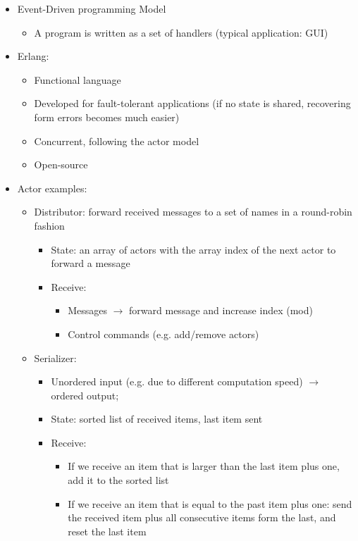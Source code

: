 \documentclass[a4paper]{article}
\begin{document}
\begin{itemize}
\begin{itemize}
\end{itemize}
\item Event-Driven programming Model 
\begin{itemize}
\item A program is written as a set of handlers (typical application: GUI)
\end{itemize}
\item Erlang: 
\begin{itemize}
\item Functional language
\item Developed for fault-tolerant applications (if no state is shared, recovering form errors becomes much easier)
\item Concurrent, following the actor model
\item Open-source 
\end{itemize}
\item Actor examples: 
\begin{itemize}
\item Distributor: forward received messages to a set of names in a round-robin fashion
\begin{itemize}
\item State: an array of actors with the array index of the next actor to forward a message
\item Receive: 
\begin{itemize}
\item Messages $\rightarrow$ forward message and increase index (mod)
\item Control commands (e.g. add/remove actors)
\end{itemize}
\end{itemize}
\item Serializer: 
\begin{itemize}
\item Unordered input (e.g. due to different computation speed) $\rightarrow$ ordered output; 
\item State: sorted list of received items, last item sent
\item Receive: 
\begin{itemize}
\item If we receive an item that is larger than the last item plus one, add it to the sorted list
\item If we receive an item that is equal to the past item plus one: send the received item plus all consecutive items form the last, and reset the last item



\end{itemize}
\end{itemize}
\end{itemize}
\end{itemize}
\end{document}
